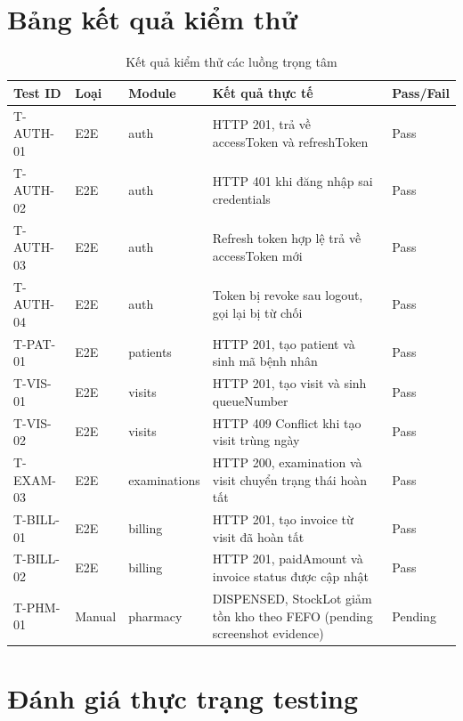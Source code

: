 \section{Bảng kết quả kiểm thử}

\begin{longtable}{|p{2cm}|p{1.5cm}|p{2.5cm}|p{5.5cm}|p{2cm}|}
\caption{Kết quả kiểm thử các luồng trọng tâm}\\
\hline
\textbf{Test ID} & \textbf{Loại} & \textbf{Module} & \textbf{Kết quả thực tế} & \textbf{Pass/Fail} \\
\hline
T-AUTH-01 & E2E & auth & HTTP 201, trả về accessToken và refreshToken & Pass \\
\hline
T-AUTH-02 & E2E & auth & HTTP 401 khi đăng nhập sai credentials & Pass \\
\hline
T-AUTH-03 & E2E & auth & Refresh token hợp lệ trả về accessToken mới & Pass \\
\hline
T-AUTH-04 & E2E & auth & Token bị revoke sau logout, gọi lại bị từ chối & Pass \\
\hline
T-PAT-01 & E2E & patients & HTTP 201, tạo patient và sinh mã bệnh nhân & Pass \\
\hline
T-VIS-01 & E2E & visits & HTTP 201, tạo visit và sinh queueNumber & Pass \\
\hline
T-VIS-02 & E2E & visits & HTTP 409 Conflict khi tạo visit trùng ngày & Pass \\
\hline
T-EXAM-03 & E2E & examinations & HTTP 200, examination và visit chuyển trạng thái hoàn tất & Pass \\
\hline
T-BILL-01 & E2E & billing & HTTP 201, tạo invoice từ visit đã hoàn tất & Pass \\
\hline
T-BILL-02 & E2E & billing & HTTP 201, paidAmount và invoice status được cập nhật & Pass \\
\hline
T-PHM-01 & Manual & pharmacy & DISPENSED, StockLot giảm tồn kho theo FEFO (pending screenshot evidence) & Pending \\
\hline
\end{longtable}

\section{Đánh giá thực trạng testing}

